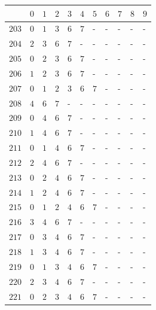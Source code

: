 \begin{appendices}
\begin{table}[H]
  	\begin{tabular} {|l|l|l|l|l|l|l|l|l|l|l|} \hline
  		\backslashbox{$Num$}{$index$} & $ 0 $ & $ 1 $ & $ 2 $ & $ 3 $ & $ 4 $ & $ 5 $ & $ 6 $ & $ 7 $ & $ 8 $ & $ 9 $ \\ \hline
  		$ 203 $ & $ 0 $ &$ 1 $ &$ 3 $ &$ 6 $ &$ 7 $ & - &  - &  - &  - &  -   \\ \hline
  		$ 204 $ & $ 2 $ &$ 3 $ &$ 6 $ &$ 7 $ & - &  - &  - &  - &  - &  -   \\ \hline
  		$ 205 $ & $ 0 $ &$ 2 $ &$ 3 $ &$ 6 $ &$ 7 $ & - &  - &  - &  - &  -   \\ \hline
  		$ 206 $ & $ 1 $ &$ 2 $ &$ 3 $ &$ 6 $ &$ 7 $ & - &  - &  - &  - &  -   \\ \hline
  		$ 207 $ & $ 0 $ &$ 1 $ &$ 2 $ &$ 3 $ &$ 6 $ &$ 7 $ & - &  - &  - &  -   \\ \hline
  		$ 208 $ & $ 4 $ &$ 6 $ &$ 7 $ & - &  - &  - &  - &  - &  - &  -   \\ \hline
  		$ 209 $ & $ 0 $ &$ 4 $ &$ 6 $ &$ 7 $ & - &  - &  - &  - &  - &  -   \\ \hline
  		$ 210 $ & $ 1 $ &$ 4 $ &$ 6 $ &$ 7 $ & - &  - &  - &  - &  - &  -   \\ \hline
  		$ 211 $ & $ 0 $ &$ 1 $ &$ 4 $ &$ 6 $ &$ 7 $ & - &  - &  - &  - &  -   \\ \hline
  		$ 212 $ & $ 2 $ &$ 4 $ &$ 6 $ &$ 7 $ & - &  - &  - &  - &  - &  -   \\ \hline
  		$ 213 $ & $ 0 $ &$ 2 $ &$ 4 $ &$ 6 $ &$ 7 $ & - &  - &  - &  - &  -   \\ \hline
  		$ 214 $ & $ 1 $ &$ 2 $ &$ 4 $ &$ 6 $ &$ 7 $ & - &  - &  - &  - &  -   \\ \hline
  		$ 215 $ & $ 0 $ &$ 1 $ &$ 2 $ &$ 4 $ &$ 6 $ &$ 7 $ & - &  - &  - &  -   \\ \hline
  		$ 216 $ & $ 3 $ &$ 4 $ &$ 6 $ &$ 7 $ & - &  - &  - &  - &  - &  -   \\ \hline
  		$ 217 $ & $ 0 $ &$ 3 $ &$ 4 $ &$ 6 $ &$ 7 $ & - &  - &  - &  - &  -   \\ \hline
  		$ 218 $ & $ 1 $ &$ 3 $ &$ 4 $ &$ 6 $ &$ 7 $ & - &  - &  - &  - &  -   \\ \hline
  		$ 219 $ & $ 0 $ &$ 1 $ &$ 3 $ &$ 4 $ &$ 6 $ &$ 7 $ & - &  - &  - &  -   \\ \hline
  		$ 220 $ & $ 2 $ &$ 3 $ &$ 4 $ &$ 6 $ &$ 7 $ & - &  - &  - &  - &  -   \\ \hline
  		$ 221 $ & $ 0 $ &$ 2 $ &$ 3 $ &$ 4 $ &$ 6 $ &$ 7 $ & - &  - &  - &  -   \\ \hline

\end{tabular}
\end{table}
\end{appendices}
